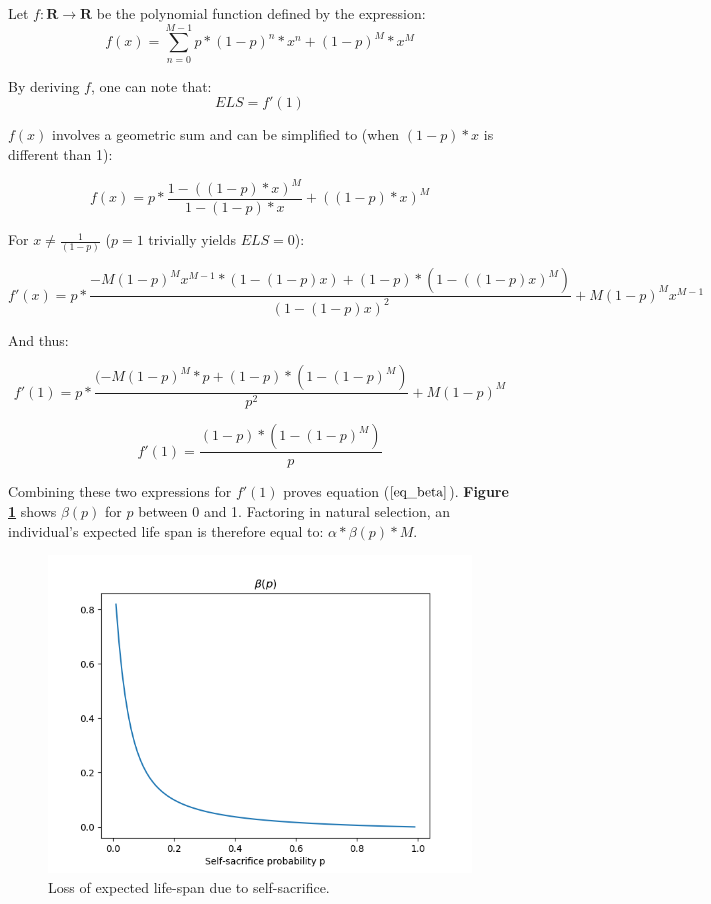 \documentclass[a4paper,12pt]{report}
\begin{document}
Let $f \colon \mathbf{R} \to \mathbf{R}$ be the polynomial function defined by the expression:
\[ f(x) = \sum_{n=0}^{M-1} p*(1-p)^n*x^n + (1-p)^M*x^M \]

By deriving $f$, one can note that:
\begin{equation}
    ELS = f'(1)
\label{eq_ELS_f}
\end{equation}

$f(x)$ involves a geometric sum and can be simplified to (when $(1-p)*x$ is different than 1):

\[ f(x) = p* \frac{1 - ((1-p)*x)^M}{1-(1-p)*x} + ((1-p)*x)^M \]

For $x\neq\frac{1}{(1-p)}$ ($p=1$ trivially yields $ELS=0$):

\[ f'(x) = p * \frac{-M(1-p)^Mx^{M-1}*(1-(1-p)x) + (1-p)*(1-((1-p)x)^M)}{(1-(1-p)x)^2} + M(1-p)^Mx^{M-1} \]

And thus:

\[f'(1) = p * \frac{(-M(1-p)^M*p + (1-p)*(1-(1-p)^M)}{p^2} + M(1-p)^M \]

\begin{equation}
    f'(1) = \frac{(1-p)*(1-(1-p)^M)}{p}
\label{eq_f'}
\end{equation}

Combining these two expressions for $f'(1)$ proves equation ($\bf\ref{eq_beta}$). \textbf{Figure \ref{fig:beta}} shows
$\beta(p)$ for $p$ between 0 and 1. Factoring in natural selection, an individual's expected life span is therefore equal to: $\alpha*\beta(p)*M$.

\begin{figure}[h]
    \centering
    \includegraphics[width=1\textwidth]{Beta}
    \caption{Loss of expected life-span due to self-sacrifice.}
    \label{fig:beta}
    \end{figure}
    
\end{document}
